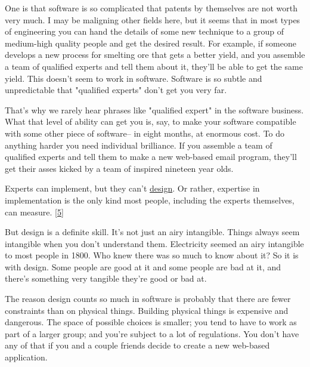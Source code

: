 One is that software is so
                  complicated that patents by themselves are not worth very
                  much. I may be maligning other fields here, but it seems that
                  in most types of engineering you can hand the details of some
                  new technique to a group of medium-high quality people and get
                  the desired result. For example, if someone develops a new
                  process for smelting ore that gets a better yield, and you
                  assemble a team of qualified experts and tell them about it,
                  they'll be able to get the same yield. This doesn't seem to
                  work in software. Software is so subtle and unpredictable that
                  "qualified experts" don't get you very far.

That's
                  why we rarely hear phrases like "qualified expert" in the
                  software business. What that level of ability can get you is,
                  say, to make your software compatible with some other piece of
                  software-- in eight months, at enormous cost. To do anything
                  harder you need individual brilliance. If you assemble a team
                  of qualified experts and tell them to make a new web-based
                  email program, they'll get their asses kicked by a team of
                  inspired nineteen year olds.

Experts can implement,
                  but they can't \href{http://www.paulgraham.com/taste.html}{design}. Or rather,
                  expertise in implementation is the only kind most people,
                  including the experts themselves, can measure.
                  [\href{\#f5n}{5}]

But design is a definite skill. It's not just an
                  airy intangible. Things always seem intangible when you don't
                  understand them. Electricity seemed an airy intangible to most
                  people in 1800. Who knew there was so much to know about it?
                  So it is with design. Some people are good at it and some
                  people are bad at it, and there's something very tangible
                  they're good or bad at.

The reason design counts so
                  much in software is probably that there are fewer constraints
                  than on physical things. Building physical things is expensive
                  and dangerous. The space of possible choices is smaller; you
                  tend to have to work as part of a larger group; and you're
                  subject to a lot of regulations. You don't have any of that if
                  you and a couple friends decide to create a new web-based
                  application.

